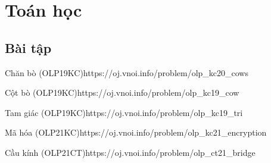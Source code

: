 \chapter{Toán học}

\minitoc

\section{Bài tập}
\begin{baitap}{Chăn bò (OLP19KC)}{https://oj.vnoi.info/problem/olp\_kc20\_cows}
\end{baitap}

\begin{baitap}{Cột bò (OLP19KC)}{https://oj.vnoi.info/problem/olp\_kc19\_cow}
\end{baitap}

\begin{baitap}{Tam giác (OLP19KC)}{https://oj.vnoi.info/problem/olp\_kc19\_tri}
\end{baitap}

\begin{baitap}{Mã hóa (OLP21KC)}{https://oj.vnoi.info/problem/olp\_kc21\_encryption}
\end{baitap}

\begin{baitap}{Cầu kính (OLP21CT)}{https://oj.vnoi.info/problem/olp\_ct21\_bridge}

\end{baitap}

